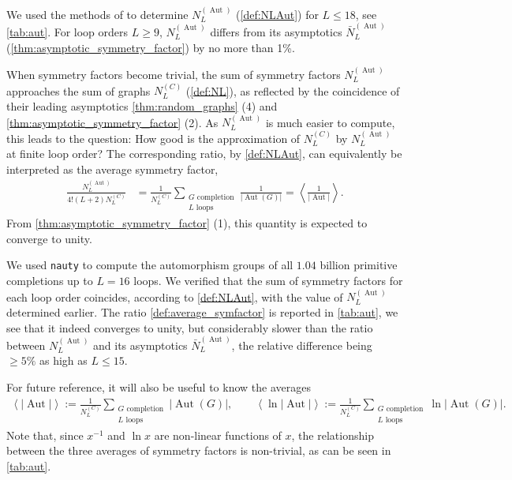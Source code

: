 \documentclass[11pt,a4paper]{article}
\newcommand{\abs}[1]{\lvert #1 \rvert}
\newcommand{\Aut}{\operatorname{Aut}}
\renewcommand{\|}{\rule[-0.4ex]{0.2ex}{1.2em}}
\begin{document}
We used the methods of \cite{cvitanovic_number_1978,borinsky_renormalized_2017} to determine $N^{(\Aut)}_L$ (\cref{def:NLAut}) for $L\leq 18$, see  \cref{tab:aut}. For loop orders $L\geq 9$, $ N^{(\Aut)}_L$ differs from its asymptotics $\bar N^{(\Aut)}_L$ (\cref{thm:asymptotic_symmetry_factor}) by no more than 1\%.

When symmetry factors become trivial, the sum of symmetry factors  $N^{(\Aut)}_L$ approaches the sum of graphs  $N^{(C)}_L$ (\cref{def:NL}), as reflected by the coincidence of their leading asymptotics \cref{thm:random_graphs} (4) and \cref{thm:asymptotic_symmetry_factor} (2). As  $N^{(\Aut)}_L$ is much easier to compute, this leads to the question: How good is the approximation of $N^{(C)}_L$ by $N^{(\Aut)}_L$ at finite loop order? The corresponding ratio, by \cref{def:NLAut}, can equivalently be interpreted as the average symmetry factor,
\begin{align}\label{def:average_symfactor}
	\frac{N^{(\Aut)}_L}{4! (L+2)N^{(C)}_L} &=  \frac{1}{N^{(C)}_L}\sum_{ \substack{G \text{ completion}\\  L \text{ loops}}} \frac{1 }{\abs{\Aut (G)}} = \left \langle \frac 1 {\abs{\Aut}} \right \rangle .
\end{align}
 From \cref{thm:asymptotic_symmetry_factor} (1), this quantity is expected to converge to unity.

We used \texttt{nauty} \cite{mckay_practical_2014} to compute the automorphism groups of all $1.04$ billion primitive completions up to $L=16$ loops.  We verified that the sum of symmetry factors for each loop order coincides, according to \cref{def:NLAut},  with the value of $N^{(\Aut)}_L$ determined earlier. 
The ratio \cref{def:average_symfactor} is reported in \cref{tab:aut}, we see that it indeed converges to unity, but considerably slower than   the ratio between $N^{(\Aut)}_L$ and its asymptotics $\bar N^{(\Aut)}_L$, the relative difference being $\geq 5\%$ as high as $L \leq 15$. 

For future reference, it will also be useful to know the averages
\begin{align*}
	\left \langle \abs{\Aut} \right \rangle  := \frac{1}{N^{(C)}_L}\sum_{\substack{G \text{ completion}\\ L \text{ loops} }} \abs{\Aut(G)}, \qquad 
	\left \langle \ln \abs{\Aut} \right \rangle   :=  \frac{1}{N^{(C)}_L}\sum_{ \substack{G \text{ completion}\\ L \text{ loops}}}  \ln \abs{\Aut(G)}.
\end{align*}
Note that, since $x^{-1}$ and $\ln x$ are non-linear functions of $x$, the relationship between the three averages of symmetry factors is non-trivial, as can be seen in \cref{tab:aut}.
\end{document}
